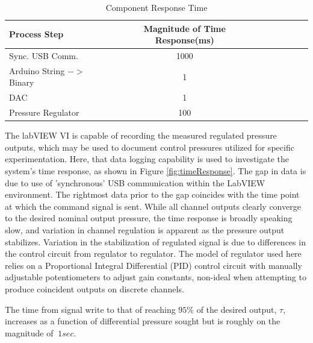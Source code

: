 \begin{table}[H]
\begin{center}
\begin{tabular}{l*{6}{c}r}
Process Step & Magnitude of Time Response(ms) \\
\hline
Sync. USB Comm. & 1000 \\
Arduino String $->$ Binary & 1 \\
DAC & 1\\
Pressure Regulator & 100\\
\end{tabular}
\caption [Component Response Time]{Component Response Time} 
\label{tab:compTime}
\end{center}
\end{table}

The labVIEW VI is capable of recording the measured regulated pressure outputs, which may be used to document control pressures utilized for specific experimentation. Here, that data logging capability is used to investigate the system's time response, as shown in Figure \vref{fig:timeResponse}. The gap in data is due to use of 'synchronous' USB communication within the LabVIEW environment. The rightmost data prior to the gap coincides with the time point at which the command signal is sent. While all channel outputs clearly converge to the desired nominal output pressure, the time response is broadly speaking slow, and variation in channel regulation is apparent as the pressure output stabilizes. Variation in the stabilization of regulated signal is due to differences in the control circuit from regulator to regulator. The model of regulator used here relies on a Proportional Integral Differential (PID) control circuit with manually adjustable potentiometers to adjust gain constants, non-ideal when attempting to produce coincident outputs on discrete channels.

The time from signal write to that of reaching $95\%$ of the desired output, $\tau$, increases as a function of differential pressure sought but is roughly on the magnitude of $~1 sec$. 

